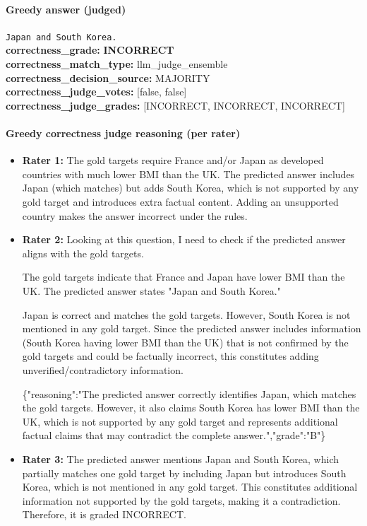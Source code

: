 \documentclass[11pt]{article}
\newcommand{\gradebad}[1]{\textcolor{red!70!black}{\textbf{#1}}}
\newcommand{\mono}[1]{\texttt{#1}}
\begin{document}
\paragraph{Greedy answer (judged)}
\mono{Japan and South Korea.}\\
\textbf{correctness\_grade:} \gradebad{INCORRECT}\\
\textbf{correctness\_match\_type:} llm\_judge\_ensemble\\
\textbf{correctness\_decision\_source:} MAJORITY\\
\textbf{correctness\_judge\_votes:} [false, false]\\
\textbf{correctness\_judge\_grades:} [INCORRECT, INCORRECT, INCORRECT]\\
\paragraph{Greedy correctness judge reasoning (per rater)}
\begin{itemize}
\item \textbf{Rater 1:} The gold targets require France and/or Japan as developed countries with much lower BMI than the UK. The predicted answer includes Japan (which matches) but adds South Korea, which is not supported by any gold target and introduces extra factual content. Adding an unsupported country makes the answer incorrect under the rules.
\item \textbf{Rater 2:} Looking at this question, I need to check if the predicted answer aligns with the gold targets.

The gold targets indicate that France and Japan have lower BMI than the UK. The predicted answer states "Japan and South Korea."

Japan is correct and matches the gold targets. However, South Korea is not mentioned in any gold target. Since the predicted answer includes information (South Korea having lower BMI than the UK) that is not confirmed by the gold targets and could be factually incorrect, this constitutes adding unverified/contradictory information.

\{"reasoning":"The predicted answer correctly identifies Japan, which matches the gold targets. However, it also claims South Korea has lower BMI than the UK, which is not supported by any gold target and represents additional factual claims that may contradict the complete answer.","grade":"B"\}
\item \textbf{Rater 3:} The predicted answer mentions Japan and South Korea, which partially matches one gold target by including Japan but introduces South Korea, which is not mentioned in any gold target. This constitutes additional information not supported by the gold targets, making it a contradiction. Therefore, it is graded INCORRECT.
\end{itemize}
\end{document}
